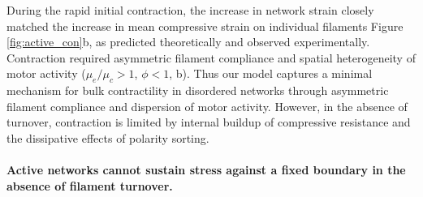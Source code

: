 \documentclass[10pt,letterpaper]{article}
\begin{document}
During the rapid initial contraction, the increase in network strain closely matched the increase in mean compressive strain on individual filaments Figure \ref{fig:active_con}b, as predicted theoretically \cite{1367-2630-14-3-033037,PhysRevX.4.041002} and observed experimentally\cite{rheo_2D1}. Contraction required asymmetric filament compliance and spatial heterogeneity of motor activity ($\mu_e/\mu_c > 1$, $\phi<1$, b). Thus our model captures a minimal mechanism for bulk contractility in disordered networks through asymmetric filament compliance and dispersion of motor activity. However, in the absence of turnover, contraction is limited by internal buildup of compressive resistance and the dissipative effects of polarity sorting.


\paragraph{Active networks cannot sustain stress against a fixed boundary in the absence of filament turnover.}
\end{document}
